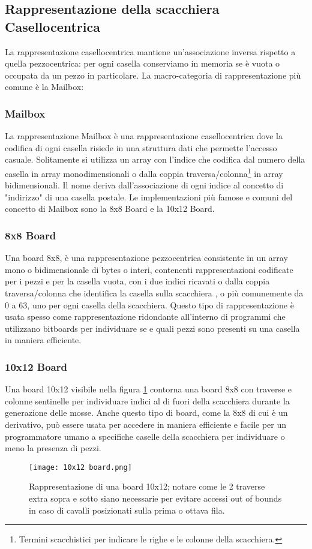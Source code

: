 \subsection{Rappresentazione della scacchiera Casellocentrica}
La rappresentazione casellocentrica  mantiene un'associazione inversa rispetto a quella pezzocentrica:
per ogni casella conserviamo in memoria se è vuota o occupata da un pezzo in particolare.
La macro-categoria di  rappresentazione più comune è la Mailbox:

\subsubsection{Mailbox}
La rappresentazione Mailbox è una rappresentazione casellocentrica dove la codifica di ogni casella risiede in una struttura dati
che permette l'accesso casuale. Solitamente si utilizza un array con l'indice che codifica dal numero della casella in array monodimensionali
o dalla coppia traversa/colonna\footnote{Termini scacchistici per indicare le righe e le colonne della scacchiera.} in array bidimensionali.
Il nome deriva dall'associazione di ogni indice al concetto di "indirizzo" di una casella postale. Le implementazioni più famose e
comuni del concetto di Mailbox sono la 8x8 Board e la 10x12 Board.

\subsubsection{8x8 Board}
Una board 8x8, è una rappresentazione pezzocentrica consistente  in un array mono o bidimensionale di bytes o interi, contenenti rappresentazioni codificate
per i pezzi e per la casella vuota, con i due indici ricavati o dalla coppia traversa/colonna che identifica la casella sulla scacchiera ,
o più comunemente  da 0 a 63, uno per ogni casella della scacchiera.
Questo tipo di rappresentazione è usata spesso come rappresentazione ridondante all'interno di programmi che utilizzano bitboards
per individuare se e quali pezzi sono presenti su una casella in maniera efficiente.

\subsubsection{10x12 Board}
Una board 10x12 visibile nella figura \ref{10x12} contorna una board 8x8 con traverse e colonne sentinelle per individuare indici al di fuori della scacchiera durante la generazione delle mosse. Anche questo tipo di board, 
come la 8x8 di cui è un derivativo, può essere usata per accedere in maniera efficiente e facile per un programmatore umano a specifiche caselle della scacchiera per individuare o meno la presenza di pezzi.
\vfill
\begin{figure}[!ht]
    \centering
    \texttt{[image: 10x12 board.png]}
    \caption{Rappresentazione di una board 10x12; notare come le 2 traverse extra sopra e sotto siano necessarie per evitare accessi out of bounds in caso di cavalli posizionati sulla prima o ottava fila. }
    \label{10x12}
\end{figure}



